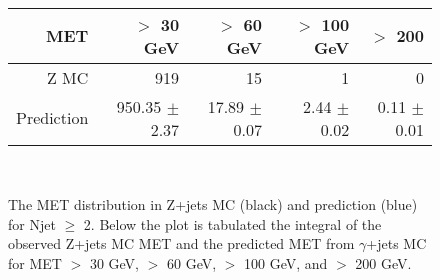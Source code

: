 \begin{figure}[hbt]
  \begin{center}
	\\ \medskip
    \begin{tabular}{r|r|r|r|r}
      MET        & $>$ 30 GeV       & $>$ 60 GeV        & $>$ 100 GeV       & $>$ 200  \\ \hline
	  Z MC       &   919            &    15             &     1             &     0 \\
	  Prediction & 950.35 $\pm$  2.37 &  17.89 $\pm$   0.07 &   2.44 $\pm$   0.02 &   0.11 $\pm$   0.01 \\

    \end{tabular}
	\\ \medskip
    \caption{The MET distribution in Z+jets MC (black) and prediction (blue) for Njet $\ge$ 2. 
	  Below the plot is tabulated the integral of the observed Z+jets MC MET and the predicted 
	  MET from $\gamma$+jets MC for 
	  MET $>$ 30 GeV, $>$ 60 GeV, $>$ 100 GeV, and $>$ 200 GeV. 
	}
    \label{fig:mcclosure}
  \end{center}
\end{figure}




